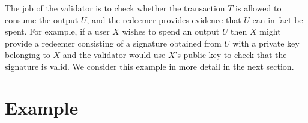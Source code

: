 \documentclass[a4paper]{article}
\begin{document}
The job of the validator is to check whether the transaction $T$ is
allowed to consume the output $U$, and the redeemer provides evidence
that $U$ can in fact be spent.  For example, if a user $X$ wishes to
spend an output $U$ then $X$ might provide a redeemer consisting of a
signature obtained from $U$ with a private key belonging to $X$ and
the validator would use $X$'s public key to check that the signature
is valid.  We consider this example in more detail in the next
section.

\section{Example}





%

%

%


%
\end{document}
